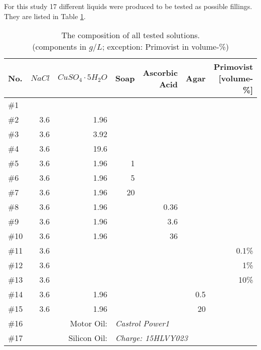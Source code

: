 For this study 17 different liquids were produced to be tested as possible fillings.
They are listed in Table \ref{tab:solutions}.


\begin{table}[!hbt]
\centering
\begin{tabular}{@{}l|rrrrrr@{}}
No.   & $NaCl$   & $CuSO_4\cdot5H_2O$          & Soap & Ascorbic Acid & Agar & Primovist [volume-\%]\\
\toprule
\#1  &             &                   &      &               &           &		\\
\#2  & 3.6         & 1.96              &      &               &           &		\\
\#3  & 3.6         & 3.92              &      &               &           &		\\
\#4  & 3.6         & 19.6              &      &               &           &		\\
\#5  & 3.6         & 1.96              & 1    &               &           &		\\
\#6  & 3.6         & 1.96              & 5    &               &           &		\\
\#7  & 3.6         & 1.96              & 20   &               &           &		\\
\#8  & 3.6         & 1.96              &      & 0.36          &           &		\\
\#9  & 3.6         & 1.96              &      & 3.6           &           &		\\
\#10 & 3.6         & 1.96              &      & 36            &           &		\\
\#11 & 3.6         &                   &      &               &           & 0.1\%	\\
\#12 & 3.6         &                   &      &               &           & 1\%		\\
\#13 & 3.6         &                   &      &               &           & 10\%	\\
\#14 & 3.6         & 1.96              &      &               &  0.5      &		\\
\#15 & 3.6         & 1.96              &      &               &   20      &		\\
\midrule
\#16 & \multicolumn{2}{r}{Motor Oil:}   & \multicolumn{4}{l}{\textit{Castrol Power1}}      \\
\#17 & \multicolumn{2}{r}{Silicon Oil:} & \multicolumn{4}{l}{\textit{Charge: 15HLVY023}}   \\ \bottomrule
\end{tabular}
\caption{The composition of all tested solutions.\\(components in $g/L$; exception: Primovist in volume-\%)}
\label{tab:solutions}
\end{table}

